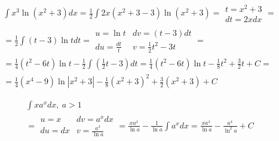 
\begin{gather*}\int x^3\ln(x^2+3)dx = \frac{1}{2}\int 2x (x^2+3-3)\ln(x^2+3) = \begin{array}{|l|}
t=x^2+3 \\ dt=2xdx \end{array} = \\ = \frac{1}{2}\int (t-3)\ln t dt = \begin{array}{|ll|}
u=\ln t & dv=(t-3)dt \\
du=\frac{dt}{t} & v=\frac{1}{2}t^2-3t
\end{array} = \\ = \frac{1}{4}(t^2-6t)\ln t - \frac{1}{2}\int (\frac{1}{2}t-3)dt = \frac{1}{4}(t^2-6t)\ln t - \frac{1}{8}t^2+\frac{3}{2}t+C = \\ =  \frac{1}{4}(x^4-9)\ln|x^2+3|  - \frac{1}{8}(x^2+3)^2+\frac{3}{2}(x^2+3)+C\end{gather*}



\begin{gather*}\int xa^xdx, \ a>1 \\
= \begin{array}{|ll|}
u=x & dv=a^xdx \\
du=dx & v=\frac{a^x}{\ln a} \end{array} = \frac{xa^x}{\ln a} - \frac{1}{\ln a}\int a^xdx = \frac{xa^x}{\ln a} - \frac{a^x}{\ln^2 a}+C\end{gather*}
